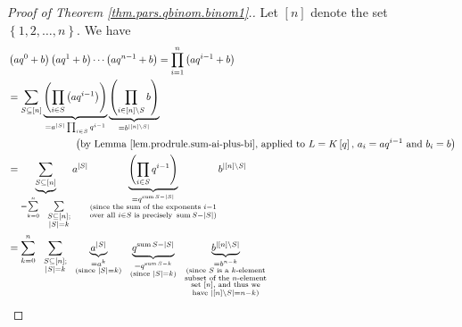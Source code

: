\begin{proof}
[Proof of Theorem \ref{thm.pars.qbinom.binom1}.]Let $\left[  n\right]  $
denote the set $\left\{  1,2,\ldots,n\right\}  $. We have%
\begin{align*}
&  \left(  aq^{0}+b\right)  \left(  aq^{1}+b\right)  \cdots\left(
aq^{n-1}+b\right)  =\prod_{i=1}^{n}\left(  aq^{i-1}+b\right) \\
&  =\sum_{S\subseteq\left[  n\right]  }\underbrace{\left(  \prod_{i\in
S}\left(  aq^{i-1}\right)  \right)  }_{=a^{\left\vert S\right\vert }%
\prod_{i\in S}q^{i-1}}\underbrace{\left(  \prod_{i\in\left[  n\right]
\setminus S}b\right)  }_{=b^{\left\vert \left[  n\right]  \setminus
S\right\vert }}\\
&  \ \ \ \ \ \ \ \ \ \ \ \ \ \ \ \ \ \ \ \ \left(  \text{by Lemma
\ref{lem.prodrule.sum-ai-plus-bi}, applied to }L=K\left[  q\right]  \text{,
}a_{i}=aq^{i-1}\text{ and }b_{i}=b\right) \\
&  =\underbrace{\sum_{S\subseteq\left[  n\right]  }}_{=\sum\limits_{k=0}%
^{n}\ \ \sum\limits_{\substack{S\subseteq\left[  n\right]  ;\\\left\vert
S\right\vert =k}}}a^{\left\vert S\right\vert }\underbrace{\left(  \prod_{i\in
S}q^{i-1}\right)  }_{\substack{=q^{\operatorname*{sum}S-\left\vert
S\right\vert }\\\text{(since the sum of the exponents }i-1\\\text{over all
}i\in S\text{ is precisely }\operatorname*{sum}S-\left\vert S\right\vert
\text{)}}}b^{\left\vert \left[  n\right]  \setminus S\right\vert }\\
&  =\sum_{k=0}^{n}\ \ \sum_{\substack{S\subseteq\left[  n\right]
;\\\left\vert S\right\vert =k}}\ \ \underbrace{a^{\left\vert S\right\vert }%
}_{\substack{=a^{k}\\\text{(since }\left\vert S\right\vert =k\text{)}%
}}\ \ \underbrace{q^{\operatorname*{sum}S-\left\vert S\right\vert }%
}_{\substack{=q^{\operatorname*{sum}S-k}\\\text{(since }\left\vert
S\right\vert =k\text{)}}}\ \ \underbrace{b^{\left\vert \left[  n\right]
\setminus S\right\vert }}_{\substack{=b^{n-k}\\\text{(since }S\text{ is a
}k\text{-element}\\\text{subset of the }n\text{-element}\\\text{set }\left[
n\right]  \text{, and thus we}\\\text{have }\left\vert \left[  n\right]
\setminus S\right\vert =n-k\text{)}}}\\

\end{align*}
\end{proof}
